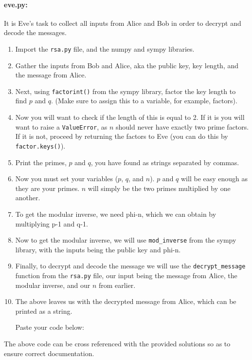 \documentclass{article}
\begin{document}
    \paragraph{eve.py:} It is Eve’s task to collect all inputs from Alice and Bob in order to decrypt and decode the messages.

    \begin{enumerate}
        \item Import the \verb|rsa.py| file, and the numpy and sympy libraries.

        \item Gather the inputs from Bob and Alice, aka the public key, key length, and the message from Alice.

        \item Next, using \verb|factorint()| from the sympy library, factor the key length to find $p$ and $q$. (Make sure to assign this to a variable, for example, factors).

        \item Now you will want to check if the length of this is equal to 2. If it is you will want to raise a \verb|ValueError|, as $n$ should never have exactly two prime factors. If it is not, proceed by returning the factors to Eve (you can do this by \verb|factor.keys()|).

        \item Print the primes, $p$ and $q$, you have found as strings separated by commas.

        \item Now you must set your variables ($p$, $q$, and $n$). $p$ and $q$ will be easy enough as they are your primes. $n$ will simply be the two primes multiplied by one another.

        \item To get the modular inverse, we need phi-n, which we can obtain by multiplying p-1 and q-1.

        \item Now to get the modular inverse, we will use \verb|mod_inverse| from the sympy library, with the inputs being the public key and phi-n.

        \item Finally, to decrypt and decode the message we will use the \verb|decrypt_message| function from the \verb|rsa.py| file, our input being the message from Alice, the modular inverse, and our $n$ from earlier.

        \item The above leaves us with the decrypted message from Alice, which can be printed as a string.

        Paste your code below:

            \TextField[width=6in,height=5in, bordercolor=0 0 0, name=bob2, multiline=true]{}
    \end{enumerate}

    The above code can be cross referenced with the provided solutions so as to ensure correct documentation.
\end{document}
